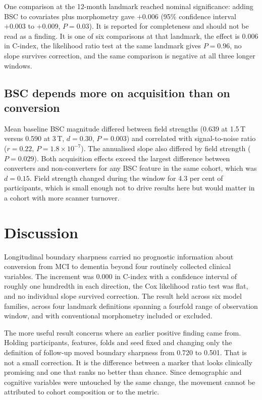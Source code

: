 \documentclass[blue]{ludusofficial}
\begin{document}
One comparison at the 12-month landmark reached nominal significance: adding BSC to covariates plus morphometry gave $+0.006$ (95\% confidence interval $+0.003$ to $+0.009$, $P = 0.03$). It is reported for completeness and should not be read as a finding. It is one of six comparisons at that landmark, the effect is 0.006 in C-index, the likelihood ratio test at the same landmark gives $P = 0.96$, no slope survives correction, and the same comparison is negative at all three longer windows.

\subsection{BSC depends more on acquisition than on conversion}

Mean baseline BSC magnitude differed between field strengths (0.639 at 1.5\,T versus 0.590 at 3\,T, $d = 0.30$, $P = 0.003$) and correlated with signal-to-noise ratio ($r = 0.22$, $P = 1.8 \times 10^{-7}$). The annualised slope also differed by field strength ($P = 0.029$). Both acquisition effects exceed the largest difference between converters and non-converters for any BSC feature in the same cohort, which was $d = 0.15$. Field strength changed during the window for 4.3 per cent of participants, which is small enough not to drive results here but would matter in a cohort with more scanner turnover.

\section{Discussion}

Longitudinal boundary sharpness carried no prognostic information about conversion from MCI to dementia beyond four routinely collected clinical variables. The increment was 0.000 in C-index with a confidence interval of roughly one hundredth in each direction, the Cox likelihood ratio test was flat, and no individual slope survived correction. The result held across six model families, across four landmark definitions spanning a fourfold range of observation window, and with conventional morphometry included or excluded.

The more useful result concerns where an earlier positive finding came from. Holding participants, features, folds and seed fixed and changing only the definition of follow-up moved boundary sharpness from 0.720 to 0.501. That is not a small correction. It is the difference between a marker that looks clinically promising and one that ranks no better than chance. Since demographic and cognitive variables were untouched by the same change, the movement cannot be attributed to cohort composition or to the metric.
\end{document}
